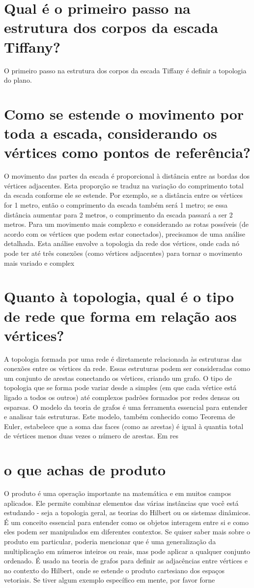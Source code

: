\documentclass[11pt,a4paper]{article}
\begin{document}
\section{Qual é o primeiro passo na estrutura dos corpos da escada Tiffany?}
O primeiro passo na estrutura dos corpos da escada Tiffany é definir a topologia do plano.

\section{Como se estende o movimento por toda a escada, considerando os vértices como pontos de referência?}
O movimento das partes da escada é proporcional à distância entre as bordas dos vértices adjacentes. Esta proporção se traduz na variação do comprimento total da escada conforme ele se estende. Por exemplo, se a distância entre os vértices for 1 metro, então o comprimento da escada também será 1 metro; se essa distância aumentar para 2 metros, o comprimento da escada passará a ser 2 metros. Para um movimento mais complexo e considerando as rotas possíveis (de acordo com os vértices que podem estar conectados), precisamos de uma análise detalhada. Esta análise envolve a topologia da rede dos vértices, onde cada nó pode ter até três conexões (como vértices adjacentes) para tornar o movimento mais variado e complex

\section{Quanto à topologia, qual é o tipo de rede que forma em relação aos vértices?}
A topologia formada por uma rede é diretamente relacionada às estruturas das conexões entre os vértices da rede. Essas estruturas podem ser consideradas como um conjunto de arestas conectando os vértices, criando um grafo. O tipo de topologia que se forma pode variar desde a simples (em que cada vértice está ligado a todos os outros) até complexos padrões formados por redes densas ou esparsas. O modelo da teoria de grafos é uma ferramenta essencial para entender e analisar tais estruturas. Este modelo, também conhecido como Teorema de Euler, estabelece que a soma das faces (como as arestas) é igual à quantia total de vértices menos duas vezes o número de arestas. Em res

\section{o que achas de produto}
O produto é uma operação importante na matemática e em muitos campos aplicados. Ele permite combinar elementos das várias instâncias que você está estudando - seja a topologia geral, as teorias do Hilbert ou os sistemas dinâmicos. É um conceito essencial para entender como os objetos interagem entre si e como eles podem ser manipulados em diferentes contextos. Se quiser saber mais sobre o produto em particular, poderia mencionar que é uma generalização da multiplicação em números inteiros ou reais, mas pode aplicar a qualquer conjunto ordenado. É usado na teoria de grafos para definir as adjacências entre vértices e no contexto do Hilbert, onde se estende o produto cartesiano dos espaços vetoriais. Se tiver algum exemplo específico em mente, por favor forne
\end{document}
